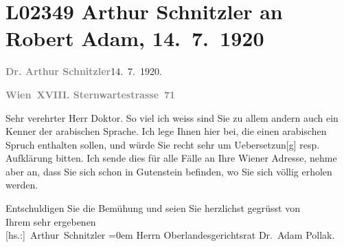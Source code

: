 

\section[Arthur Schnitzler an Robert Adam, 14. 7. 1920]{L02349 Arthur Schnitzler an Robert Adam, 14. 7. 1920}
\nopagebreak{}
\rehead{ }\normalsize\beginnumbering{}
\toendnotes[C]{\smallbreak\pagebreak[2]}
\toendnotes[C]{\smallbreak}
\pstart
           {\pb}\textcolor{gray}{\textbf{Dr. Arthur Schnitzler}}\hfill 14. 7. 1920.\pend
           
\pstart
           \textcolor{gray}{\textbf{Wien XVIII. Sternwartestrasse 71}}\pend
           
\pstart{}Sehr verehrter Herr Doktor.\pend\vspace{0.5em}
\pstart
           So viel ich weiss sind Sie zu allem andern auch ein Kenner der arabischen Sprache.
               Ich lege Ihnen hier \label{K_L02349-1v}\label{K_L02349-1} bei, die
               einen arabischen Spruch enthalten sollen, und würde Sie recht sehr um
                  Uebersetzun{[}g{]} resp. Aufklärung bitten. Ich sende dies für alle
               Fälle an Ihre Wiener Adresse, nehme aber an, dass
               Sie sich schon in Gutenstein befinden, wo Sie
               sich völlig erholen werden.\pend
           
\pstart
           Entschuldigen Sie die Bemühung und seien Sie herzlichst gegrüsst von{\\[\baselineskip]}Ihrem
               sehr ergebenen{\\[\baselineskip]}\spacefill\mbox{{[}hs.:{]} Arthur Schnitzler}\pend
           \leftskip=0em{}
\pstart
           \noindent{}Herrn Oberlandesgerichtsrat Dr. Adam Pollak.\pend
           \endnumbering{}  
      
